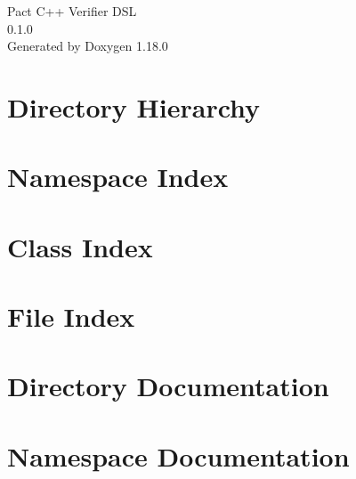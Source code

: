 \documentclass[twoside]{book}
\newcommand{\+}{\discretionary{\mbox{\scriptsize$\hookleftarrow$}}{}{}}
\newcommand{\clearemptydoublepage}{%
    \newpage{\pagestyle{empty}\cleardoublepage}%
  }
\begin{document}
  \raggedbottom
    \hypersetup{pageanchor=false,
                bookmarksnumbered=true,
                pdfencoding=unicode
               }
  \begin{titlepage}
  \vspace*{7cm}
  \begin{center}%
  {\Large Pact C++ Verifier DSL}\\
  [1ex]\large 0.\+1.\+0 \\
  \vspace*{1cm}
  {\large Generated by Doxygen 1.18.0}\\
  \end{center}
  \end{titlepage}
  \clearemptydoublepage
  \tableofcontents
  \clearemptydoublepage
  \hypersetup{pageanchor=true}
\chapter{Directory Hierarchy}

\chapter{Namespace Index}

\chapter{Class Index}

\chapter{File Index}

\chapter{Directory Documentation}


\chapter{Namespace Documentation}


\end{document}
